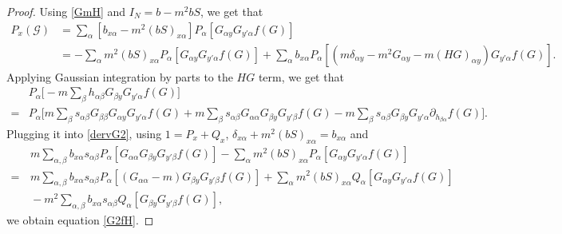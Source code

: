 \documentclass{article}
\newcommand{\1}{\mathds{1}}
\numberwithin{equation}{section}
\newcommand{\al}{\alpha}
\renewcommand{\cal}{\mathcal}
\theoremstyle{plain} %
\theoremstyle{remark}
\begin{document}
\begin{proof}
Using \eqref{GmH} and $I_N=b - m^2 bS$, we get that  
\begin{align}
   P_x\left(  \cal G\right) & = \sum_\al \left[ b_{x\al} -m^2 (b S)_{x\al}\right] P_\al\left[G_{\al y}   G_{y' \al}f(G)\right] \nonumber\\
   &= -\sum_\al m^2 (b S)_{x\al}  P_\al\left[G_{\al y}   G_{y' \al}f(G)\right] + \sum_\al  b_{x\al} P_\al\left[ \left(m\delta_{\al y}-m^2G_{\al y} - m (HG)_{\al y}\right) G_{y' \al} f(G)\right] .\label{dervG2}
  \end{align}
 Applying Gaussian integration by parts to the $ HG $ term, we get that
\begin{align*}
   &P_\al\Big[  -m \sum_\beta h_{\al\beta}G_{\beta y} G_{y' \al} f(G)\Big] \\
   =& P_\al\Big[ m \sum_\beta  s_{\al\beta}G_{\beta\beta} G_{\al y}   G_{y' \al}f(G) + m \sum_\beta s_{\al\beta} G_{\al\al}  G_{\beta y}   G_{y' \beta}f(G) - m \sum_\beta s_{\al\beta}G_{\beta y} G_{y' \al} \partial_{ h_{ \beta \al}}f(G)\Big].
\end{align*}
Plugging it into \eqref{dervG2},  using $1=P_x+Q_x$, $\delta_{x\al}+m^2 (b S)_{x\al}=b_{x\al}$ and 
\begin{align*}
& \, m \sum_{\al, \beta}b_{x\al} s_{\al\beta}  P_\al\left[G_{\al\al}  G_{\beta y}   G_{y' \beta}f(G)\right] -\sum_\al m^2 (b S)_{x\al}  P_\al\left[G_{\al y}   G_{y' \al}f(G) \right] \\
=&\,  m \sum_{\al, \beta}b_{x\al} s_{\al\beta}  P_\al\left[  (G_{\al\al}-m)  G_{\beta y}   G_{y' \beta}f(G)\right] + \sum_\al m^2 (b S)_{x\al}  Q_\al\left[G_{\al y}   G_{y' \al}f(G)\right] \\
&\,   - m^2 \sum_{\al, \beta}b_{x\al} s_{\al\beta}  Q_\al\left[G_{\beta y}   G_{y' \beta}f(G)\right] ,
\end{align*}
 we  obtain equation \eqref{G2fH}. 
  \end{proof}
\end{document}
